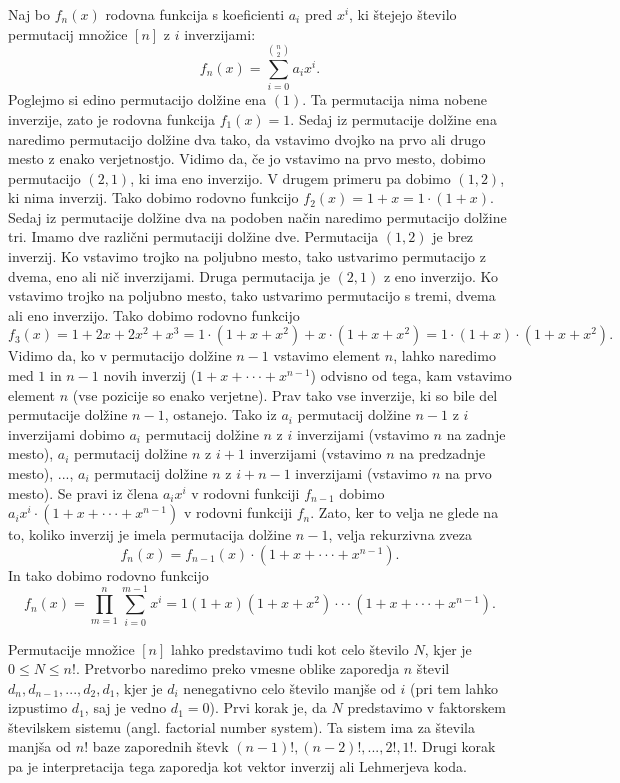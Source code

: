 \documentclass[a4paper, 12pt]{book}
\begin{document}
Naj bo $f_n(x)$ rodovna funkcija s koeficienti $a_i$ pred $x^i$, ki štejejo število permutacij množice $[n]$ z $i$ inverzijami:
\[
    f_n(x) = \sum_{i=0}^{\binom{n}{2}} a_i x^i.
\]
Poglejmo si edino permutacijo dolžine ena $(1)$. Ta permutacija nima nobene inverzije, zato je rodovna funkcija $f_1(x) = 1$. Sedaj iz permutacije dolžine ena naredimo permutacijo dolžine dva tako, da vstavimo dvojko na prvo ali drugo mesto z enako verjetnostjo. Vidimo da, če jo vstavimo na prvo mesto, dobimo permutacijo $(2, 1)$, ki ima eno inverzijo. V drugem primeru pa dobimo $(1, 2)$, ki nima inverzij. Tako dobimo rodovno funkcijo $f_2(x) = 1 + x = 1 \cdot (1 + x)$. Sedaj iz permutacije dolžine dva na podoben način naredimo permutacijo dolžine tri. Imamo dve različni permutaciji dolžine dve. Permutacija $(1, 2)$ je brez inverzij. Ko vstavimo trojko na poljubno mesto, tako ustvarimo permutacijo z dvema, eno ali nič inverzijami. Druga permutacija je $(2, 1)$ z eno inverzijo. Ko vstavimo trojko na poljubno mesto, tako ustvarimo permutacijo s tremi, dvema ali eno inverzijo. Tako dobimo rodovno funkcijo 
\[
    f_3(x) = 1 + 2x + 2x^2 + x^3 = 1 \cdot (1 + x + x^2) + x \cdot (1 + x + x^2) = 1 \cdot (1 + x) \cdot (1 + x + x^2).
\]
Vidimo da, ko v permutacijo dolžine $n-1$ vstavimo element $n$, lahko naredimo med $1$ in $n-1$ novih inverzij ($1 + x + \cdot\cdot\cdot + x^{n-1}$) odvisno od tega, kam vstavimo element $n$ (vse pozicije so enako verjetne). Prav tako vse inverzije, ki so bile del permutacije dolžine $n-1$, ostanejo. Tako iz $a_i$ permutacij dolžine $n-1$ z $i$ inverzijami dobimo $a_i$ permutacij dolžine $n$ z $i$ inverzijami (vstavimo $n$ na zadnje mesto), $a_i$ permutacij dolžine $n$ z $i+1$ inverzijami (vstavimo $n$ na predzadnje mesto), ..., $a_i$ permutacij dolžine $n$ z $i+n-1$ inverzijami (vstavimo $n$ na prvo mesto). Se pravi iz člena $a_i x^i$ v rodovni funkciji $f_{n-1}$ dobimo $a_i x^i \cdot (1 + x + \cdot\cdot\cdot + x^{n-1})$ v rodovni funkciji $f_n$.
Zato, ker to velja ne glede na to, koliko inverzij je imela permutacija dolžine $n-1$, velja rekurzivna zveza
\[
    f_n(x) = f_{n-1}(x) \cdot (1 + x + \cdot\cdot\cdot + x^{n-1}).
\]
In tako dobimo rodovno funkcijo
\[
    f_n(x) = \prod_{m=1}^{n}\sum_{i=0}^{m-1} x^i = 1 (1 + x) (1 + x + x^2) \cdot\cdot\cdot (1 + x + \cdot\cdot\cdot + x^{n-1}).
\]

Permutacije množice $[n]$ lahko predstavimo tudi kot celo število $N$, kjer je $0 \leq N \leq n!$. Pretvorbo naredimo preko vmesne oblike zaporedja $n$ števil $d_n,d_{n-1},...,d_2,d_1$, kjer je $d_i$ nenegativno celo število manjše od $i$ (pri tem lahko izpustimo $d_1$, saj je vedno $d_1 = 0$). Prvi korak je, da $N$ predstavimo v faktorskem številskem sistemu (angl. factorial number system). Ta sistem ima za števila manjša od $n!$ baze zaporednih števk $(n-1)!,(n-2)!,...,2!,1!$. Drugi korak pa je interpretacija tega zaporedja kot vektor inverzij ali Lehmerjeva koda.
\end{document}
